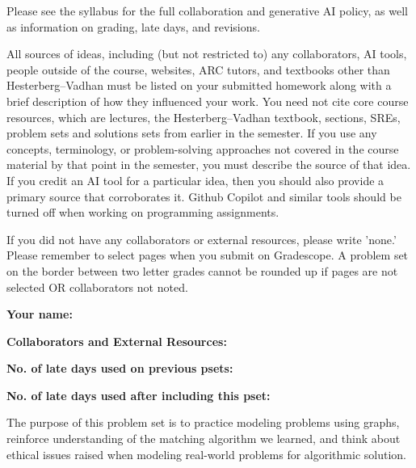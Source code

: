 \documentclass[11pt]{article}
\begin{document}

Please see the syllabus for the full collaboration and generative AI policy, as well as information on grading, late days, and revisions.

All sources of ideas, including (but not restricted to) any collaborators, AI tools, people outside of the course, websites, ARC tutors, and textbooks other than Hesterberg--Vadhan must be listed on your submitted homework along with a brief description of how they influenced your work. You need not cite core course resources, which are lectures, the Hesterberg--Vadhan textbook, sections, SREs, problem sets and solutions sets from earlier in the semester. If you use any concepts, terminology, or problem-solving approaches not covered in the course material by that point in the semester, you must describe the source of that idea. If you credit an AI tool for a particular idea, then you should also provide a primary source that corroborates it. Github Copilot and similar tools should be turned off when working on programming assignments.

If you did not have any collaborators or external resources, please write 'none.' Please remember to select pages when you submit on Gradescope. A problem set on the border between two letter grades cannot be rounded up if pages are not selected OR collaborators not noted.

\vspace{1em}

\textbf{Your name: }

\textbf{Collaborators and External Resources: }

\textbf{No. of late days used on previous psets: }

\textbf{No. of late days used after including this pset: }

\vspace{1em}


The purpose of this problem set is to practice modeling problems using graphs, reinforce understanding of the matching algorithm we learned, and think about ethical issues raised when modeling real-world problems for algorithmic solution.
\end{document}
